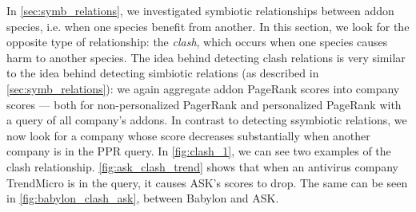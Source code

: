 \documentclass[11pt,oneside]{book}
\begin{document}
In \autoref{sec:symb_relations}, we investigated symbiotic relationships between addon species, i.e. when one species benefit from another. In this section, we look for the opposite type of relationship: the \emph{clash}, which occurs when one species causes harm to another species. The idea behind detecting clash relations is very similar to the idea behind detecting simbiotic relations (as described in \autoref{sec:symb_relations}): we again aggregate addon PageRank scores into company scores --- both for non-personalized PagerRank and personalized PageRank with a query of all company's addons. In contrast to detecting ssymbiotic relations, we now look for a company whose score decreases substantially when another company is in the PPR query. In \autoref{fig:clash_1}, we can see two examples of the clash relationship. \autoref{fig:ask_clash_trend} shows that when an antivirus company TrendMicro is in the query, it causes ASK's scores to drop. The same can be seen in \autoref{fig:babylon_clash_ask}, between Babylon and ASK.

\end{document}
